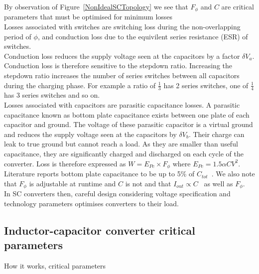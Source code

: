 \documentclass[letterpaper,twocolumn,10pt]{article}
\begin{document}
By observation of Figure~\ref{NonIdealSCTopology} we see that $F_\phi$ and $C$ are critical parameters that must be optimised for minimum losses\\
Losses associated with switches are switching loss during the non-overlapping period of $\phi$, and conduction loss due to the equivilent series resistance (ESR) of switches.\\
Conduction loss reduces the supply voltage seen at the capacitors by a factor $\delta V_a$. Conduction loss is therefore sensitive to the stepdown ratio. Increasing the stepdown ratio increases the number of series switches between all capacitors during the charging phase. For example a ratio of $\frac{1}{3}$ has 2 series switches, one of $\frac{1}{4}$ has 3 series switches and so on.\\
Losses associated with capacitors are parasitic capacitance losses. A parasitic capacitance known as bottom plate capacitance exists between one plate of each capacitor and ground. The voltage of these parasitic capacitor is a virtual ground and reduces the supply voltage seen at the capacitors by $\delta V_b$. Their charge can leak to true ground but cannot reach a load. As they are smaller than useful capacitance, they are significantly charged and discharged on each cycle of the converter. Loss is therefore expressed as $W = E_{Pc} \times F_\phi$ where $E_{Pc} = 1.5\alpha CV^2$. Literature reports bottom plate capacitance to be up to 5\% of $C_{tot}$~\cite{Ramadass2007}. We also note that $F_\phi$ is adjustable at runtime and $C$ is not and that $I_{out} \propto C$~\cite{Damak2013} as well as $F_\phi$.\\
In SC converters then, careful design considering voltage specification and technology parameters optimises converters to their load. 

\subsection{Inductor-capacitor converter critical parameters}

How it works, critical parameters
\end{document}
